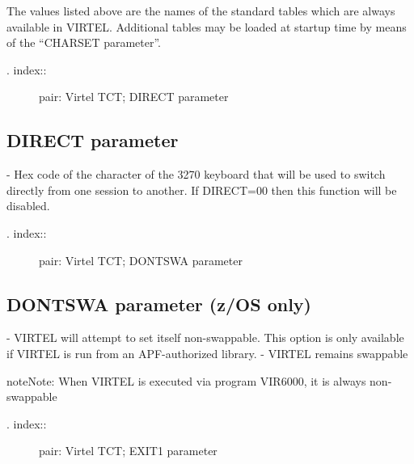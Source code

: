 \documentclass[letterpaper,10pt,english]{sphinxmanual}
\begin{document}
The values listed above are the names of the standard tables which are always available in VIRTEL. Additional tables
may be loaded at startup time by means of the “CHARSET parameter”.
\begin{description}
\item[{. index::}] \leavevmode
pair: Virtel TCT; DIRECT parameter

\end{description}


\subsection{DIRECT parameter}
\label{\detokenize{Installation_Guide:direct-parameter}}
\begin{sphinxVerbatim}[commandchars=\\\{\}]
  
\end{sphinxVerbatim}

 - Hex code of the character of the 3270 keyboard that will be used to switch directly from one session to another. If DIRECT=00 then this function will be disabled.
\begin{description}
\item[{. index::}] \leavevmode
pair: Virtel TCT; DONTSWA parameter

\end{description}


\subsection{DONTSWA parameter (z/OS only)}
\label{\detokenize{Installation_Guide:dontswa-parameter-z-os-only}}
\begin{sphinxVerbatim}[commandchars=\\\{\}]
 
\end{sphinxVerbatim}

 - VIRTEL will attempt to set itself non-swappable. This option is only available if VIRTEL is run from an APF-authorized library.
 - VIRTEL remains swappable

\begin{sphinxadmonition}{note}{Note:}
When VIRTEL is executed via program VIR6000, it is always non-swappable
\end{sphinxadmonition}
\begin{description}
\item[{. index::}] \leavevmode
pair: Virtel TCT; EXIT1 parameter

\end{description}
\end{document}
